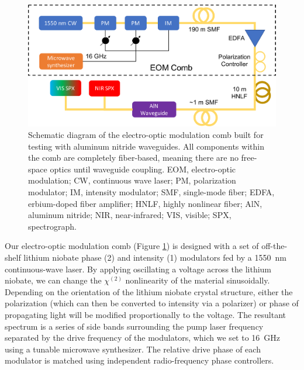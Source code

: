\begin{figure}
    \centering
    \includegraphics[width=\textwidth]{figures-3/eom-diagram.pdf}
    \caption[Electro-optic modulation comb schematic diagram]{Schematic diagram of the electro-optic modulation comb built for testing with aluminum nitride waveguides. All components within the comb are completely fiber-based, meaning there are no free-space optics until waveguide coupling. EOM, electro-optic modulation; CW, continuous wave laser; PM, polarization modulator; IM, intensity modulator; SMF, single-mode fiber; EDFA, erbium-doped fiber amplifier; HNLF, highly nonlinear fiber; AlN, aluminum nitride; NIR, near-infrared; VIS, visible; SPX, spectrograph.}
    \label{fig:eom-diagram}
\end{figure}

Our electro-optic modulation comb (Figure \ref{fig:eom-diagram}) is designed with a set of off-the-shelf lithium niobate phase (2) and intensity (1) modulators fed by a 1550~\si{\nano\meter} continuous-wave laser. By applying oscillating a voltage across the lithium niobate, we can change the $\chi^{(2)}$ nonlinearity of the material sinusoidally. Depending on the orientation of the lithium niobate crystal structure, either the polarization (which can then be converted to intensity via a polarizer) or phase of propagating light will be modified proportionally to the voltage. The resultant spectrum is a series of side bands surrounding the pump laser frequency separated by the drive frequency of the modulators, which we set to 16~\si{\giga\hertz} using a tunable microwave synthesizer. The relative drive phase of each modulator is matched using independent radio-frequency phase controllers.

